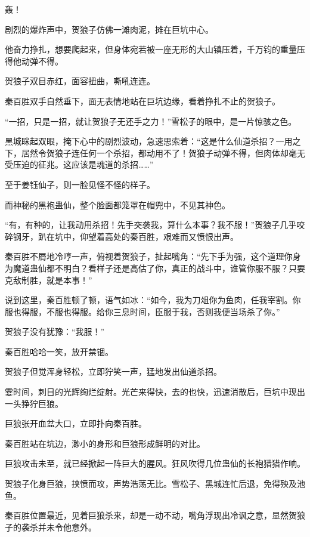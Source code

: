 
\begin{this_body}

轰！

剧烈的爆炸声中，贺狼子仿佛一滩肉泥，摊在巨坑中心。

他奋力挣扎，想要爬起来，但身体宛若被一座无形的大山镇压着，千万钧的重量压得他动弹不得。

贺狼子双目赤红，面容扭曲，嘶吼连连。

秦百胜双手自然垂下，面无表情地站在巨坑边缘，看着挣扎不止的贺狼子。

“一招，只是一招，就让贺狼子无还手之力！”雪松子的眼中，是一片惊骇之色。

黑城眯起双眼，掩下心中的剧烈波动，急速思索着：“这是什么仙道杀招？一用之下，居然令贺狼子连任何一个杀招，都动用不了！贺狼子动弹不得，但肉体却毫无受压迫的征兆。这应该是魂道的杀招……”

至于姜钰仙子，则一脸见怪不怪的样子。

而神秘的黑袍蛊仙，整个脸面都笼罩在帽兜中，不见其神色。

“有，有种的，让我动用杀招！先手突袭我，算什么本事？我不服！”贺狼子几乎咬碎钢牙，趴在坑中，仰望着高处的秦百胜，艰难而又愤恨出声。

秦百胜不屑地冷哼一声，俯视着贺狼子，扯起嘴角：“先下手为强，这个道理你身为魔道蛊仙都不明白？看样子还是高估了你，真正的战斗中，谁管你服不服？只要克敌制胜，就是本事！”

说到这里，秦百胜顿了顿，语气如冰：“如今，我为刀俎你为鱼肉，任我宰割。你服也得服，不服也得服。给你三息时间，臣服于我，否则我便当场杀了你。”

贺狼子没有犹豫：“我服！”

秦百胜哈哈一笑，放开禁锢。

贺狼子但觉浑身轻松，立即狞笑一声，猛地发出仙道杀招。

霎时间，刺目的光辉绚烂绽射。光芒来得快，去的也快，迅速消散后，巨坑中现出一头狰狞巨狼。

巨狼张开血盆大口，立即扑向秦百胜。

秦百胜站在坑边，渺小的身形和巨狼形成鲜明的对比。

巨狼攻击未至，就已经掀起一阵巨大的腥风。狂风吹得几位蛊仙的长袍猎猎作响。

贺狼子化身巨狼，挟愤而攻，声势浩荡无比。雪松子、黑城连忙后退，免得殃及池鱼。

秦百胜位置最近，见着巨狼杀来，却是一动不动，嘴角浮现出冷讽之意，显然贺狼子的袭杀并未令他意外。


\end{this_body}
